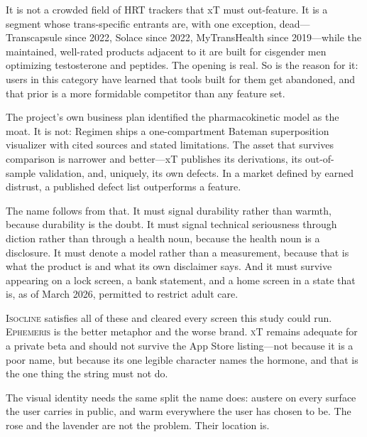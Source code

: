 \documentclass[11pt,a4paper]{article}
\newcommand{\name}[1]{\textsc{#1}}
\begin{document}
It is not a crowded field of HRT trackers that xT must out-feature. It
is a segment whose trans-specific entrants are, with one exception,
dead---Transcapsule since 2022, Solace since 2022, MyTransHealth since
2019---while the maintained, well-rated products adjacent to it are
built for cisgender men optimizing testosterone and peptides. The
opening is real. So is the reason for it: users in this category have
learned that tools built for them get abandoned, and that prior is a
more formidable competitor than any feature set.

The project's own business plan identified the pharmacokinetic model as
the moat. It is not: Regimen ships a one-compartment Bateman
superposition visualizer with cited sources and stated limitations. The
asset that survives comparison is narrower and better---xT publishes
its derivations, its out-of-sample validation, and, uniquely, its own
defects. In a market defined by earned distrust, a published defect
list outperforms a feature.

The name follows from that. It must signal durability rather than
warmth, because durability is the doubt. It must signal technical
seriousness through diction rather than through a health noun, because
the health noun is a disclosure. It must denote a model rather than a
measurement, because that is what the product is and what its own
disclaimer says. And it must survive appearing on a lock screen, a bank
statement, and a home screen in a state that is, as of March 2026,
permitted to restrict adult care.

\name{Isocline} satisfies all of these and cleared every screen this
study could run. \name{Ephemeris} is the better metaphor and the worse
brand. \name{xT} remains adequate for a private beta and should not
survive the App Store listing---not because it is a poor name, but
because its one legible character names the hormone, and that is the
one thing the string must not do.

The visual identity needs the same split the name does: austere on
every surface the user carries in public, and warm everywhere the user
has chosen to be. The rose and the lavender are not the problem. Their
location is.
\end{document}
